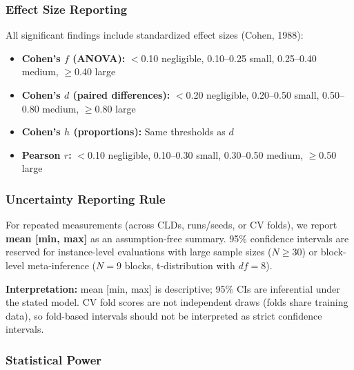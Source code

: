 \subsubsection{Effect Size Reporting}
\label{sec:effect_sizes}

All significant findings include standardized effect sizes (Cohen, 1988):
\begin{itemize}[noitemsep]
    \item \textbf{Cohen's $f$ (ANOVA):} $<$0.10 negligible, 0.10--0.25 small, 0.25--0.40 medium, $\geq$0.40 large
    \item \textbf{Cohen's $d$ (paired differences):} $<$0.20 negligible, 0.20--0.50 small, 0.50--0.80 medium, $\geq$0.80 large
    \item \textbf{Cohen's $h$ (proportions):} Same thresholds as $d$
    \item \textbf{Pearson $r$:} $<$0.10 negligible, 0.10--0.30 small, 0.30--0.50 medium, $\geq$0.50 large
\end{itemize}

\subsubsection{Uncertainty Reporting Rule}
\label{sec:uncertainty_rule}

For repeated measurements (across CLDs, runs/seeds, or CV folds), we report \textbf{mean [min, max]} as an assumption-free summary. 95\% confidence intervals are reserved for instance-level evaluations with large sample sizes ($N \geq 30$) or block-level meta-inference ($N=9$ blocks, t-distribution with $df=8$).

\textbf{Interpretation:} mean [min, max] is descriptive; 95\% CIs are inferential under the stated model. CV fold scores are not independent draws (folds share training data), so fold-based intervals should not be interpreted as strict confidence intervals.

\subsubsection{Statistical Power}
\label{sec:statistical_power}

